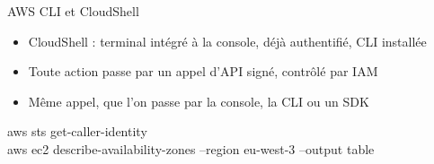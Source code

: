\begin{frame}[fragile]{AWS CLI et CloudShell}
  \begin{itemize}
    \setlength{\itemsep}{.5em}
    \item CloudShell : terminal intégré à la console, déjà authentifié, CLI installée
    \item Toute action passe par un appel d'API signé, contrôlé par IAM
    \item Même appel, que l'on passe par la console, la CLI ou un SDK
  \end{itemize}
  \begin{terminal}
aws sts get-caller-identity\\
aws ec2 describe-availability-zones --region eu-west-3 --output table
  \end{terminal}
\end{frame}


